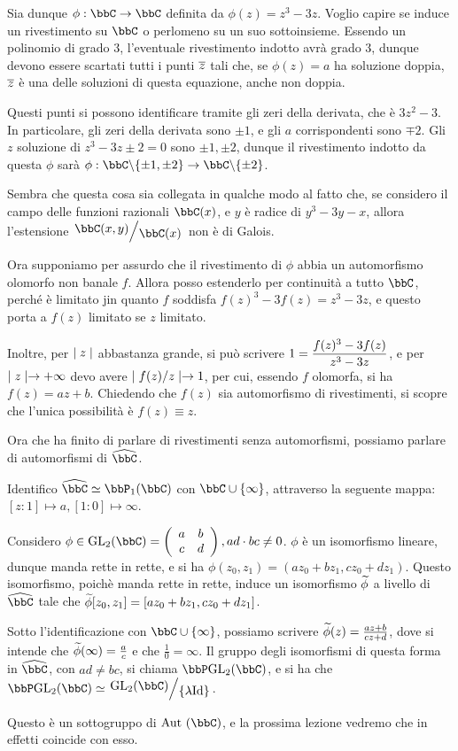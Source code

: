 Sia dunque $\phi:\bbC\rar\bbC$ definita da $\phi(z)=z^3-3z$. Voglio capire se induce un rivestimento su $\bbC$ o perlomeno su un suo sottoinsieme.
Essendo un polinomio di grado $3$, l'eventuale rivestimento indotto avrà grado $3$, dunque devono essere scartati tutti i punti $\overline{z}$ tali che, se $\phi(z)=a$ ha soluzione doppia, $\overline{z}$ è una delle soluzioni di questa equazione, anche non doppia.

Questi punti si possono identificare tramite gli zeri della derivata, che è $3z^2-3$. In particolare, gli zeri della derivata sono $\pm1$, e gli $a$ corrispondenti sono $\mp2$. Gli $z$ soluzione di $z^3-3z\pm2=0$ sono $\pm1,\pm2$, dunque il rivestimento indotto da questa $\phi$ sarà $\phi:\bbC\minus\{\pm1,\pm2\}\rar\bbC\minus\{\pm2\}$.


Sembra che questa cosa sia collegata in qualche modo al fatto che, se considero il campo delle funzioni razionali $\bbC(x)$, e $y$ è radice di $y^3-3y-x$, allora l'estensione $\quotient{\bbC(x,y)}{\bbC(x)}$ non è di Galois.

Ora supponiamo per assurdo che il rivestimento di $\phi$ abbia un automorfismo olomorfo non banale $f$. Allora posso estenderlo per continuità a tutto $\bbC$, perché è limitato jin quanto $f$ soddisfa $f(z)^3-3f(z)=z^3-3z$, e questo porta a $f(z)$ limitato se $z$ limitato.

Inoltre, per $\mid z \mid$ abbastanza grande, si può scrivere $\displaystyle 1=\frac{f(z)^3-3f(z)}{z^3-3z}$, e per $\mid z \mid\rightarrow+\infty$ devo avere $\mid f(z)/z \mid\rightarrow1$, per cui, essendo $f$ olomorfa, si ha $f(z)=az+b$. Chiedendo che $f(z)$ sia automorfismo di rivestimenti, si scopre che l'unica possibilità è $f(z)\equiv z$.

Ora che ha finito di parlare di rivestimenti senza automorfismi, possiamo parlare di automorfismi di $\oc \bbC$.

Identifico $\oc\bbC\isom\bbP_1(\bbC)$ con $\bbC\cup\{\infty\}$, attraverso la seguente mappa: $[z:1]\mapsto a, [1:0]\mapsto\infty$.

Considero $\phi\in\GL_2(\bbC)=\matrice abcd, ad\cdot bc \neq 0$. $\phi$ è un isomorfismo lineare, dunque manda rette in rette, e si ha $\phi(z_0,z_1)=(az_0+bz_1,cz_0+dz_1)$. Questo isomorfismo, poichè manda rette in rette, induce un isomorfismo $\widetilde{\phi}$ a livello di $\oc\bbC$ tale che $\widetilde{\phi}[z_0,z_1]=[az_0+bz_1,cz_0+dz_1]$.

Sotto l'identificazione con $\bbC\cup\{\infty\}$, possiamo scrivere $\widetilde{\phi}(z)=\frac{az+b}{cz+d}$, dove si intende che $\widetilde{\phi}(\infty)=\frac{a}{c}$ e che $\frac{1}{0}=\infty$. Il gruppo degli isomorfismi di questa forma in $\oc \bbC$, con $ad\neq bc$, si chiama $\bbP\GL_2(\bbC)$, e si ha che $\bbP\GL_2(\bbC)\isom\quotient{\GL_2(\bbC)}{\{\lambda\Id\}}$.

Questo è un sottogruppo di $\Aut(\bbC)$, e la prossima lezione vedremo che in effetti coincide con esso.
